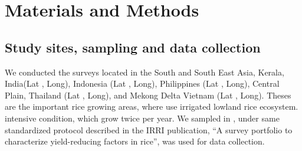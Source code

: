 \section*{Materials and Methods}

\subsection*{Study sites, sampling and data collection}
We conducted the surveys located in the South and South East Asia, Kerala, India(Lat , Long), Indonesia (Lat , Long), Philippines (Lat , Long), Central Plain, Thailand (Lat , Long), and Mekong Delta Vietnam (Lat , Long). Theses are the important rice growing areas, where use irrigated lowland rice ecosystem.  intensive condition, which grow twice per year. We sampled in , under same standardized protocol described in the IRRI publication, ``A survey portfolio to characterize yield-reducing factors in rice'', was used for data collection.